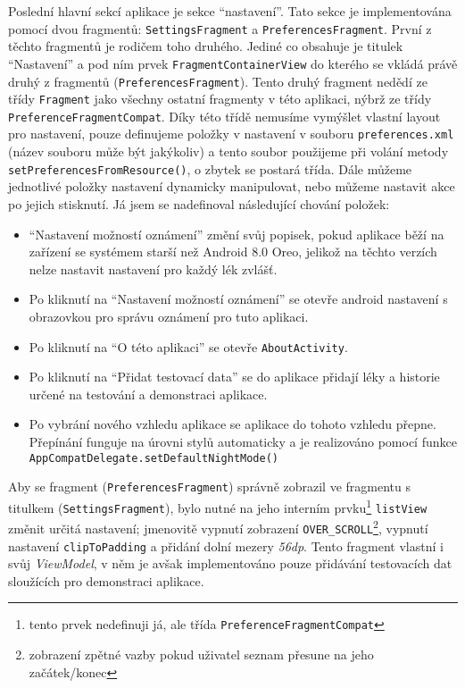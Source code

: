 \documentclass[../TakeYourPill.tex]{subfiles}
\begin{document}
Poslední hlavní sekcí aplikace je sekce \enquote{nastavení}. Tato sekce je implementována pomocí dvou fragmentů: \texttt{SettingsFragment} a \texttt{PreferencesFragment}. První z těchto fragmentů je rodičem toho druhého. Jediné co obsahuje je titulek \enquote{Nastavení} a pod ním prvek \texttt{FragmentContainerView} do kterého se vkládá právě druhý z fragmentů (\texttt{PreferencesFragment}). Tento druhý fragment nedědí ze třídy \texttt{Fragment} jako všechny ostatní fragmenty v této aplikaci, nýbrž ze třídy \texttt{PreferenceFragmentCompat}. Díky této třídě nemusíme vymýšlet vlastní layout pro nastavení, pouze definujeme položky v nastavení v souboru \texttt{preferences.xml} (název souboru může být jakýkoliv) a tento soubor použijeme při volání metody \texttt{setPreferencesFromResource()}, o zbytek se postará třída. Dále můžeme jednotlivé položky nastavení dynamicky manipulovat, nebo můžeme nastavit akce po jejich stisknutí. Já jsem se nadefinoval následující chování položek:
\begin{itemize}
  \item \enquote{Nastavení možností oznámení} změní svůj popisek, pokud aplikace běží na zařízení se systémem starší než Android 8.0 Oreo, jelikož na těchto verzích nelze nastavit nastavení pro každý lék zvlášť.
  \item Po kliknutí na \enquote{Nastavení možností oznámení} se otevře android nastavení s obrazovkou pro správu oznámení pro tuto aplikaci.
  \item Po kliknutí na \enquote{O této aplikaci} se otevře \texttt{AboutActivity}.
  \item Po kliknutí na \enquote{Přidat testovací data} se do aplikace přidají léky a historie určené na testování a demonstraci aplikace.
  \item Po vybrání nového vzhledu aplikace se aplikace do tohoto vzhledu přepne. \label{sec:theme} Přepínání funguje na úrovni stylů automaticky a je realizováno pomocí funkce \texttt{AppCompatDelegate.setDefaultNightMode()}
\end{itemize}

Aby se fragment (\texttt{PreferencesFragment}) správně zobrazil ve fragmentu s titulkem (\texttt{SettingsFragment}), bylo nutné na jeho interním prvku\footnote{tento prvek nedefinuji já, ale třída \texttt{PreferenceFragmentCompat}} \texttt{listView} změnit určitá nastavení; jmenovitě vypnutí zobrazení \texttt{OVER\_SCROLL}\footnote{zobrazení zpětné vazby pokud uživatel seznam přesune na jeho začátek/konec}, vypnutí nastavení \texttt{clipToPadding} a přidání dolní mezery \textit{56dp}.
Tento fragment vlastní i svůj \textit{ViewModel}, v něm je avšak implementováno pouze přidávání testovacích dat sloužících pro demonstraci aplikace.
\end{document}
